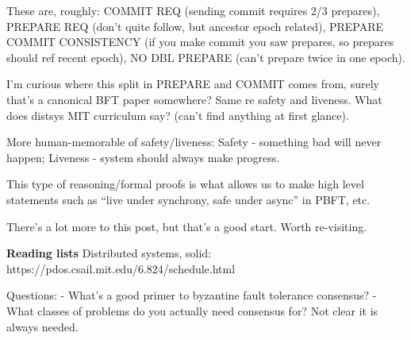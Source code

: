 \documentclass[12pt]{report}
\begin{document}
These are, roughly: COMMIT REQ (sending commit requires 2/3 prepares), PREPARE
REQ (don't quite follow, but ancestor epoch related), PREPARE COMMIT CONSISTENCY
(if you make commit you saw prepares, so prepares should ref recent epoch), NO
DBL PREPARE (can't prepare twice in one epoch).

I'm curious where this split in PREPARE and COMMIT comes from, surely that's a
canonical BFT paper somewhere? Same re safety and liveness. What does distsys
MIT curriculum say? (can't find anything at first glance).

More human-memorable of safety/liveness: Safety - something bad will never
happen; Liveness - system should always make progress.

This type of reasoning/formal proofs is what allows us to make high level
statements such as ``live under synchrony, safe under async'' in PBFT, etc.

There's a lot more to this post, but that's a good start. Worth re-visiting.



\textbf{Reading lists}
Distributed systems, solid: https://pdos.csail.mit.edu/6.824/schedule.html


Questions:
- What's a good primer to byzantine fault tolerance consensus?
- What classes of problems do you actually need consensus for? Not clear it is always needed.
\end{document}
